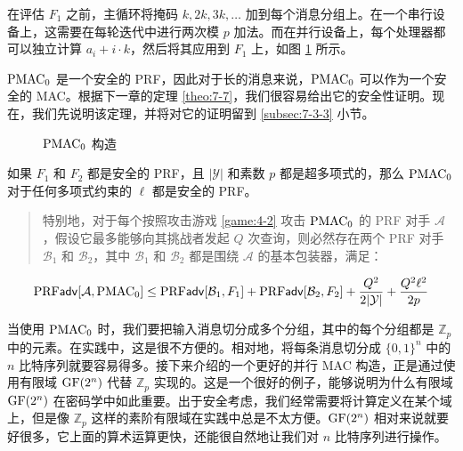 \vspace{5pt}

\noindent
在评估 $F_1$ 之前，主循环将掩码 $k,2k,3k,\dots$ 加到每个消息分组上。在一个串行设备上，这需要在每轮迭代中进行两次模 $p$ 加法。而在并行设备上，每个处理器都可以独立计算 $a_i+i\cdot k$，然后将其应用到 $F_1$ 上，如图 \ref{fig:6-9} 所示。

$\rm PMAC_0$ 是一个安全的 PRF，因此对于长的消息来说，$\rm PMAC_0$ 可以作为一个安全的 MAC。根据下一章的定理 \ref{theo:7-7}，我们很容易给出它的安全性证明。现在，我们先说明该定理，并将对它的证明留到 \ref{subsec:7-3-3} 小节。

\begin{figure}
  \centering
  
  \caption{$\rm PMAC_0$ 构造}
  \label{fig:6-9}
\end{figure}

\begin{theorem}\label{theo:6-11}
如果 $F_1$ 和 $F_2$ 都是安全的 PRF，且 $|\mathcal{Y}|$ 和素数 $p$ 都是超多项式的，那么 $\rm PMAC_0$ 对于任何多项式约束的 $\ell$ 都是安全的 PRF。
\begin{quote}
特别地，对于每个按照攻击游戏 \ref{game:4-2} 攻击 $\rm PMAC_0$ 的 PRF 对手 $\mathcal{A}$，假设它最多能够向其挑战者发起 $Q$ 次查询，则必然存在两个 PRF 对手 $\mathcal{B}_1$ 和 $\mathcal{B}_2$，其中 $\mathcal{B}_1$ 和 $\mathcal{B}_2$ 都是围绕 $\mathcal{A}$ 的基本包装器，满足：
\end{quote}
\begin{equation}\label{eq:6-28}
{\rm PRF}\mathsf{adv}[\mathcal{A}, {\rm PMAC_0}]\leq{\rm PRF}\mathsf{adv}[\mathcal{B}_1,F_1]+{\rm PRF}\mathsf{adv}[\mathcal{B}_2,F_2]+\frac{Q^2}{2|\mathcal{Y}|}+\frac{Q^2\ell^2}{2p}
\end{equation}
\end{theorem}

当使用 $\rm PMAC_0$ 时，我们要把输入消息切分成多个分组，其中的每个分组都是 $\mathbb{Z}_p$ 中的元素。在实践中，这是很不方便的。相对地，将每条消息切分成 $\{0,1\}^n$ 中的 $n$ 比特序列就要容易得多。接下来介绍的一个更好的并行 MAC 构造，正是通过使用有限域 ${\rm GF}(2^n)$ 代替 $\mathbb{Z}_p$ 实现的。这是一个很好的例子，能够说明为什么有限域 ${\rm GF}(2^n)$ 在密码学中如此重要。出于安全考虑，我们经常需要将计算定义在某个域上，但是像 $\mathbb{Z}_p$ 这样的素阶有限域在实践中总是不太方便。${\rm GF}(2^n)$ 相对来说就要好很多，它上面的算术运算更快，还能很自然地让我们对 $n$ 比特序列进行操作。

